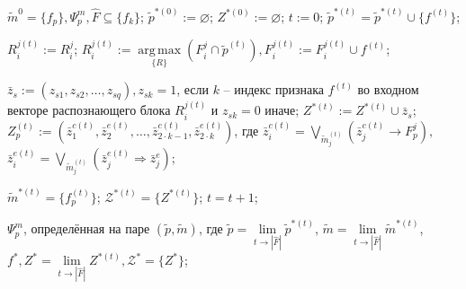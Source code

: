\documentclass[preview,convert={density=600,outext=.jpg},border=7pt]{standalone}
\DeclareMathOperator*{\argmax}{arg\,max}
\begin{document}
	
	\begin{algorithmic}[1]
				\Require $\tilde m^0=\{f_p\}, \Psi_p^m, \hat F\subseteq \{f_k\}$;
				\State $\tilde p^{*(0)} := \varnothing$;
				\State $Z^{*(0)} := \varnothing$;
				\State $t := 0$;
				\State $\tilde p^{*(t)}=\tilde p^{*(t)}\cup\{f^{(t)}\}$;
				
				\State $R_i^{j(t)}:=R_i^j$;
				\Else
				\State $R_i^{j(t)}:=\argmax\limits_{\{R\}} (F_i^j\cap\tilde p^{(t)}), F_i^{j(t)}:=F_i^{j(t)}\cup f^{(t)}$;
				\EndIf
				
				\State $\bar z_s:=(z_{s1},z_{s2},\dots,z_{sq}), z_{sk}=1$, если $k$ -- индекс признака $f^{(t)}$ во входном векторе распознающего блока $R_i^{j(t)}$ и $z_{sk}=0$ иначе;
				\State $Z^{*(t)}:=Z^{*(t)}\cup\bar z_s$;
				\State $Z_p^{(t)}:=(\bar z_1^{c(t)},\bar z_2^{e(t)},\dots,\bar z_{2\cdot k-1}^{c(t)},\bar z_{2\cdot k}^{e(t)})$, где $\bar z_i^{c(t)}=\bigvee\limits_{\tilde m_j^{(t)}}(\bar z_j^{c(t)}\rightarrow F_p^j),$ 
				\\\hspace{3.0cm}$\bar z_i^{e(t)}=\bigvee\limits_{\tilde m_j^{(t)}}(\bar z_j^{e(t)}\Rightarrow\bar z_j^e)$;
				\EndIf
				
				\State $\tilde m^{*(t)}=\{f_p^{(t)}\}$;
				\State $\mathcal Z^{*(t)}=\{Z^{*(t)}\}$;
				\State $t=t+1$;
				\EndFor
				
				\Return $\Psi_p^m$, определённая на паре $(\tilde p, \tilde m)$, где $\tilde p=\lim\limits_{t\rightarrow|\hat F|}\tilde p^{*(t)}$, $\tilde m=\lim\limits_{t\rightarrow|\hat F|}\tilde m^{*(t)}$, $f^*, Z^*=\lim\limits_{t\rightarrow|\hat F|}Z^{*(t)},\mathcal Z^*=\{Z^*\}$;
	\end{algorithmic}
\end{document}
